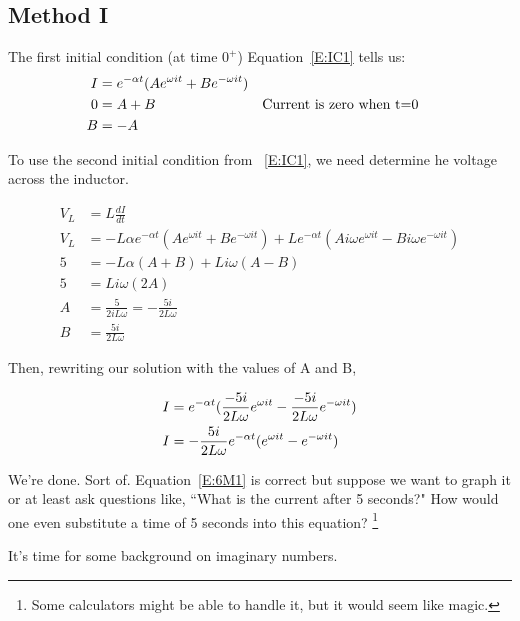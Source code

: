 \subsection{Method I}
The first initial condition (at time $0^+$) Equation~\eqref{E:IC1} tells us:
\begin{align}
I&=e^{-\alpha t}(Ae^{\omega it}+Be^{-\omega it}) \label{E:6RLC}\\
0&=A+B&&\text{Current is zero when t=0} \notag\\
B&=-A \notag
\end{align}

To use the second initial condition from ~\eqref{E:IC1}, we need determine he voltage across the inductor.\par

\begin{align*}
V_L &= L\frac{dI}{dt}\\
V_L&=-L\alpha e^{-\alpha t}(Ae^{\omega it}+Be^{-\omega it})+
	Le^{-\alpha t}(Ai\omega e^{\omega it}-Bi\omega e^{-\omega it})\\
5&=-L\alpha(A+B)+Li\omega(A-B)\\
5&=Li\omega(2A)\\
A&=\frac{5}{2iL\omega}=-\frac{5i}{2L\omega}\\
B&=\frac{5i}{2L\omega}
\end{align*}

Then, rewriting our solution with the values of A and B,

\begin{align}
I&=e^{-\alpha t}(\frac{-5i}{2L\omega}e^{\omega it}-\frac{-5i}{2L\omega}e^{-\omega it}) \notag\\
I&=-\frac{5i}{2L\omega}e^{-\alpha t}(e^{\omega it}-e^{-\omega it}) \label{E:6M1}
\end{align} 

We're done. Sort of. Equation~\eqref{E:6M1} is correct but suppose we want to graph it or at least ask questions like, ``What is the current after 5 seconds?" How would one even substitute a time of 5 seconds into this equation? \footnote{Some calculators might be able to handle it, but it would seem like magic.}\par
It's time for some background on imaginary numbers.

